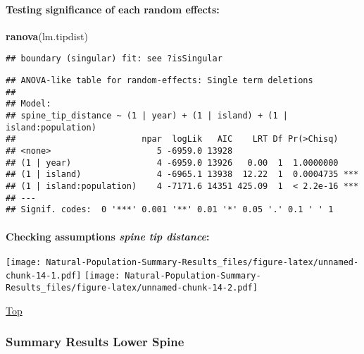 \documentclass[
]{article}
\newenvironment{Shaded}{\begin{snugshade}}{\end{snugshade}}
\newcommand{\KeywordTok}[1]{\textcolor[rgb]{0.13,0.29,0.53}{\textbf{#1}}}
\newcommand{\NormalTok}[1]{#1}
\begin{document}
\hypertarget{testing-significance-of-each-random-effects-4}{%
\paragraph{Testing significance of each random
effects:}\label{testing-significance-of-each-random-effects-4}}

\begin{Shaded}
\begin{Highlighting}[]
\KeywordTok{ranova}\NormalTok{(lm.tipdist)}
\end{Highlighting}
\end{Shaded}

\begin{verbatim}
## boundary (singular) fit: see ?isSingular
\end{verbatim}

\begin{verbatim}
## ANOVA-like table for random-effects: Single term deletions
## 
## Model:
## spine_tip_distance ~ (1 | year) + (1 | island) + (1 | island:population)
##                         npar  logLik   AIC    LRT Df Pr(>Chisq)    
## <none>                     5 -6959.0 13928                         
## (1 | year)                 4 -6959.0 13926   0.00  1  1.0000000    
## (1 | island)               4 -6965.1 13938  12.22  1  0.0004735 ***
## (1 | island:population)    4 -7171.6 14351 425.09  1  < 2.2e-16 ***
## ---
## Signif. codes:  0 '***' 0.001 '**' 0.01 '*' 0.05 '.' 0.1 ' ' 1
\end{verbatim}

\hypertarget{checking-assumptions-spine-tip-distance}{%
\paragraph{\texorpdfstring{Checking assumptions \emph{spine tip
distance}:}{Checking assumptions spine tip distance:}}\label{checking-assumptions-spine-tip-distance}}

\texttt{[image: Natural-Population-Summary-Results\_files/figure-latex/unnamed-chunk-14-1.pdf]}
\texttt{[image: Natural-Population-Summary-Results\_files/figure-latex/unnamed-chunk-14-2.pdf]}

\protect\hyperlink{generalized-linear-model}{Top}

\hypertarget{summary-results-lower-spine}{%
\subsubsection{Summary Results Lower
Spine}\label{summary-results-lower-spine}}
\end{document}
